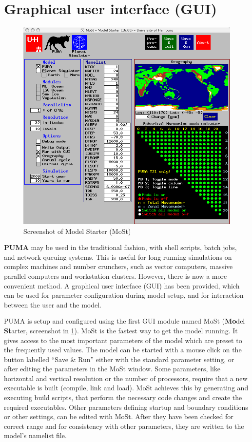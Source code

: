 \section{Graphical user interface (GUI)}

\begin{figure}
   \centering
   \includegraphics[width=14cm]{Pics/mostsnap}
   \caption[]{Screenshot of Model Starter (MoSt)}
   \label{mostsnap}
\end{figure}

{\bf PUMA} may be used in the traditional fashion,
with shell scripts, batch jobs, and network queuing 
systems. This is useful for long running simulations
on complex machines and number crunchers, such as vector 
computers, massive parallel computers and workstation clusters.
However, there is now a more convenient method.
A graphical user interface (GUI) has been provided, which 
can be used for parameter configuration during model setup, and 
for interaction between the user and the model.


PUMA is setup and configured using the first
GUI module named {\module MoSt} ({\bf Mo}del {\bf St}arter, 
screenshot in \ref{mostsnap}). 
{\module MoSt} is the fastest way to get the
model running. It gives access to the most important parameters of
the model which are preset to the frequently used values.
The model can be started with a mouse click on the button
labelled ``Save \& Run'' either with the standard parameter setting,
or after editing the parameters in the MoSt window.
Some parameters, like horizontal and vertical resolution
or the number of processors, require that a new executable is built
(compile, link and load). MoSt achieves
this by generating and executing build scripts,
that perform the necessary code changes and
create the required executables.
Other parameters defining startup and
boundary conditions or other settings, can
be edited with MoSt. After they have been checked for
correct range and for consistency with other parameters, they
are written to the model's namelist file.

